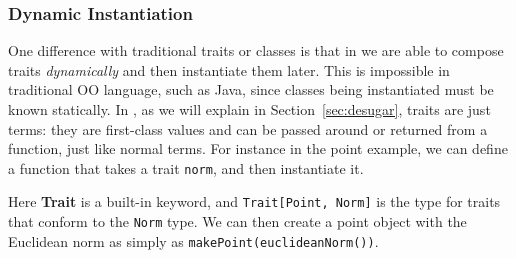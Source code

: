 
\subsubsection{Dynamic Instantiation}

One difference with traditional traits or classes is that in \name we are able
to compose traits \textit{dynamically} and then instantiate them later. This is
impossible in traditional OO language, such as Java, since classes being
instantiated must be known statically. In \name, as we will explain in
Section~\ref{sec:desugar}, traits are just terms: they are first-class values
and can be passed around or returned from a function, just like normal terms.
For instance in the point example, we can define a function that takes a trait
\lstinline$norm$, and then instantiate it.


Here \textbf{Trait} is a built-in keyword, and \lstinline$Trait[Point, Norm]$ is
the type for traits that conform to the \lstinline$Norm$ type. We can then
create a point object with the Euclidean norm as simply as
\lstinline$makePoint(euclideanNorm())$.
